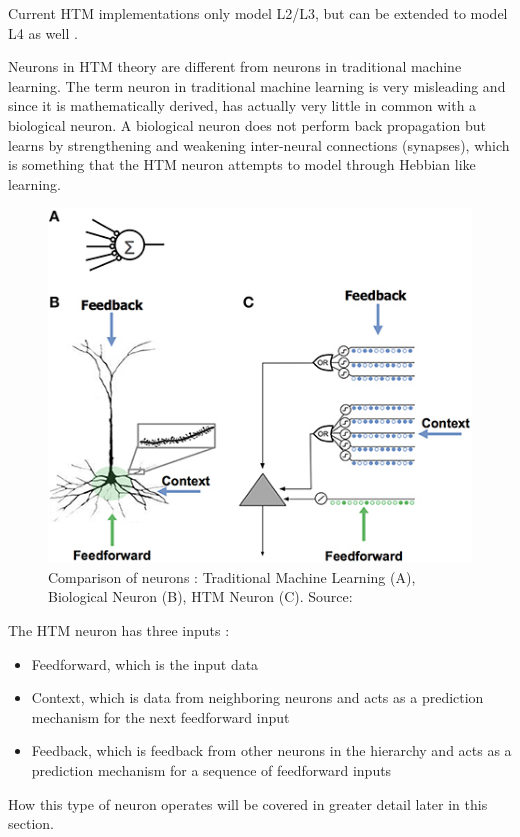 Current HTM implementations only model L2/L3, but can be extended to model L4 as well \cite{htm_l2_l3}.
\par
Neurons in HTM theory are different from neurons in traditional machine learning. The term neuron in traditional machine learning is very misleading and since it is mathematically derived, has actually very little in common with a biological neuron. A biological neuron does not perform back propagation but learns by strengthening and weakening inter-neural connections (synapses), which is something that the HTM neuron attempts to model through Hebbian like learning.
\begin{figure}[H]
    \centering
    \includegraphics[width=\linewidth]{resources/related_works/neuron_comparison.jpg}
    \caption{Comparison of neurons \protect\cite{htm_neurons}: Traditional Machine Learning (A), Biological Neuron (B), HTM Neuron (C). Source: \cite{BAMI}}
    \label{fig:neuron_comparison}
\end{figure}
The HTM neuron has three inputs \cite{htm_neurons}:
\begin{itemize}
    \item Feedforward, which is the input data
    \item Context, which is data from neighboring neurons and acts as a prediction mechanism for the next feedforward input
    \item Feedback, which is feedback from other neurons in the hierarchy and acts as a prediction mechanism for a sequence of feedforward inputs
\end{itemize}
How this type of neuron operates will be covered in greater detail later in this section.
